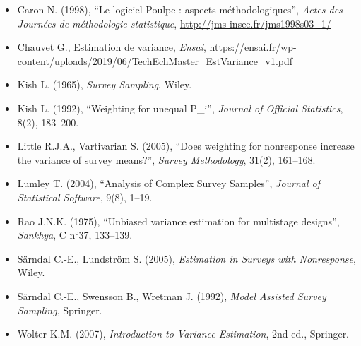 \documentclass[
]{article}
\providecommand{\tightlist}{%
  \setlength{\itemsep}{0pt}\setlength{\parskip}{0pt}}
\begin{document}
\begin{itemize}
\tightlist
\item
  Caron N. (1998), ``Le logiciel Poulpe : aspects méthodologiques'',
  \emph{Actes des Journées de méthodologie statistique},
  \url{http://jms-insee.fr/jms1998s03_1/}
\item
  Chauvet G., Estimation de variance, \emph{Ensai},
  \url{https://ensai.fr/wp-content/uploads/2019/06/TechEchMaster_EstVariance_v1.pdf}
\item
  Kish L. (1965), \emph{Survey Sampling}, Wiley.
\item
  Kish L. (1992), ``Weighting for unequal P\_i'', \emph{Journal of
  Official Statistics}, 8(2), 183--200.
\item
  Little R.J.A., Vartivarian S. (2005), ``Does weighting for nonresponse
  increase the variance of survey means?'', \emph{Survey Methodology},
  31(2), 161--168.
\item
  Lumley T. (2004), ``Analysis of Complex Survey Samples'',
  \emph{Journal of Statistical Software}, 9(8), 1--19.
\item
  Rao J.N.K. (1975), ``Unbiased variance estimation for multistage
  designs'', \emph{Sankhya}, C n°37, 133--139.
\item
  Särndal C.-E., Lundström S. (2005), \emph{Estimation in Surveys with
  Nonresponse}, Wiley.
\item
  Särndal C.-E., Swensson B., Wretman J. (1992), \emph{Model Assisted
  Survey Sampling}, Springer.
\item
  Wolter K.M. (2007), \emph{Introduction to Variance Estimation}, 2nd
  ed., Springer.
\end{itemize}
\end{document}
